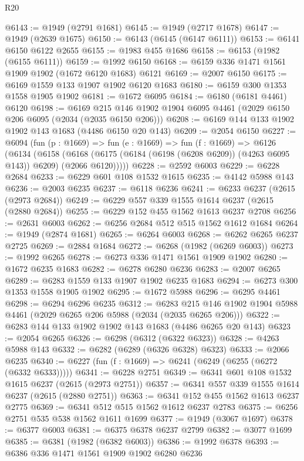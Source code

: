 \begin{lexlean}{R20}
\begin{coremodule}
@6143 := @1949 (@2791 @1681)
@6145 := @1949 (@2717 @1678)
@6147 := @1949 (@2639 @1675)
@6150 := @6143 (@6145 (@6147 @6111))
@6153 := @6141 @6150 @6122 @2655
@6155 := @1983 @455 @1686
@6158 := @6153 (@1982 (@6155 @6111))
@6159 := @1992 @6150
@6168 := @6159 @336 @1471 @1561 @1909 @1902 (@1672 @6120 @1683) @6121
@6169 := @2007 @6150
@6175 := @6169 @1559 @133 @1907 @1902 @6120 @1683
@6180 := @6159 @300 @1353 @1558 @1905 @1902
@6181 := @1672 @6095
@6184 := @6180 (@6181 @4461) @6120
@6198 := @6169 @215 @146 @1902 @1904 @6095 @4461 (@2029 @6150 @206 @6095 (@2034 (@2035 @6150 @206)))
@6208 := @6169 @144 @133 @1902 @1902 @143 @1683 (@4486 @6150 @20 @143)
@6209 := @2054 @6150
@6227 := @6094
    (fun (p : @1669) =>
    fun (e : @1669) =>
    fun (f : @1669) =>
    @6126
      (@6134
        (@6158
          (@6168 (@6175 (@6184 (@6198 (@6208 @6209)) (@4263 @6095 @143)) @6209) (@2066 @6120)))))
@6228 := @2592 @6003
@6229 := @6228 @2684
@6233 := @6229 @601 @108 @1532 @1615
@6235 := @4142 @5988 @143
@6236 := @2003 @6235
@6237 := @6118 @6236
@6241 := @6233 @6237 (@2615 (@2973 @2684))
@6249 := @6229 @557 @339 @1555 @1614 @6237 (@2615 (@2880 @2684))
@6255 := @6229 @152 @455 @1562 @1613 @6237 @2708
@6256 := @2631 @6003
@6262 := @6256 @2684 @512 @515 @1562 @1612 @1684
@6264 := @1949 (@2874 @1681)
@6265 := @6264 @6003
@6268 := @6262 @6265 @6237 @2725
@6269 := @2884 @1684
@6272 := @6268 (@1982 (@6269 @6003))
@6273 := @1992 @6265
@6278 := @6273 @336 @1471 @1561 @1909 @1902
@6280 := @1672 @6235 @1683
@6282 := @6278 @6280 @6236
@6283 := @2007 @6265
@6289 := @6283 @1559 @133 @1907 @1902 @6235 @1683
@6294 := @6273 @300 @1353 @1558 @1905 @1902
@6295 := @1672 @5988
@6296 := @6295 @4461
@6298 := @6294 @6296 @6235
@6312 := @6283 @215 @146 @1902 @1904 @5988 @4461 (@2029 @6265 @206 @5988 (@2034 (@2035 @6265 @206)))
@6322 := @6283 @144 @133 @1902 @1902 @143 @1683 (@4486 @6265 @20 @143)
@6323 := @2054 @6265
@6326 := @6298 (@6312 (@6322 @6323))
@6328 := @4263 @5988 @143
@6332 := @6282 (@6289 (@6326 @6328) @6323)
@6333 := @2066 @6235
@6340 := @6227 (fun (f : @1669) => @6241 (@6249 (@6255 (@6272 (@6332 @6333)))))
@6341 := @6228 @2751
@6349 := @6341 @601 @108 @1532 @1615 @6237 (@2615 (@2973 @2751))
@6357 := @6341 @557 @339 @1555 @1614 @6237 (@2615 (@2880 @2751))
@6363 := @6341 @152 @455 @1562 @1613 @6237 @2775
@6369 := @6341 @512 @515 @1562 @1612 @6237 @2783
@6375 := @6256 @2751 @535 @538 @1562 @1611 @1699
@6377 := @1949 (@3067 @1697)
@6378 := @6377 @6003
@6381 := @6375 @6378 @6237 @2799
@6382 := @3077 @1699
@6385 := @6381 (@1982 (@6382 @6003))
@6386 := @1992 @6378
@6393 := @6386 @336 @1471 @1561 @1909 @1902 @6280 @6236

\end{coremodule}
\end{lexlean}
